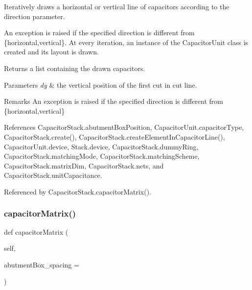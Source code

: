 Iteratively draws a horizontal or vertical line of capacitors according to the {\ttfamily direction} parameter. 

An exception is raised if the specified direction is different from {\ttfamily \{\textquotesingle{}horizontal\textquotesingle{}},\textquotesingle{}vertical\textquotesingle{}\}. At every iteration, an instance of the Capacitor\+Unit class is created and its layout is drawn. \begin{DoxyReturn}{Returns}
a list containing the drawn capacitors. 
\end{DoxyReturn}

\begin{DoxyParams}{Parameters}
{\em dy} & the vertical position of the first cut in cut line. \\
\hline
\end{DoxyParams}
\begin{DoxyRemark}{Remarks}
An exception is raised if the specified direction is different from {\ttfamily \{\textquotesingle{}horizontal\textquotesingle{}},\textquotesingle{}vertical\textquotesingle{}\} 
\end{DoxyRemark}


References Capacitor\+Stack.\+abutment\+Box\+Position, Capacitor\+Unit.\+capacitor\+Type, Capacitor\+Stack.\+create(), Capacitor\+Stack.\+create\+Element\+In\+Capacitor\+Line(), Capacitor\+Unit.\+device, Stack.\+device, Capacitor\+Stack.\+dummy\+Ring, Capacitor\+Stack.\+matching\+Mode, Capacitor\+Stack.\+matching\+Scheme, Capacitor\+Stack.\+matrix\+Dim, Capacitor\+Stack.\+nets, and Capacitor\+Stack.\+unit\+Capacitance.



Referenced by Capacitor\+Stack.\+capacitor\+Matrix().

\mbox{\label{classpython_1_1capacitormatrix_1_1CapacitorStack_af325c6856f657efc6819db6c1ed87fa0}} 
\subsubsection{\texorpdfstring{capacitor\+Matrix()}{capacitorMatrix()}}
{\footnotesize\ttfamily def capacitor\+Matrix (\begin{DoxyParamCaption}\item[{}]{self,  }\item[{}]{abutment\+Box\+\_\+spacing = {} }\end{DoxyParamCaption})}



